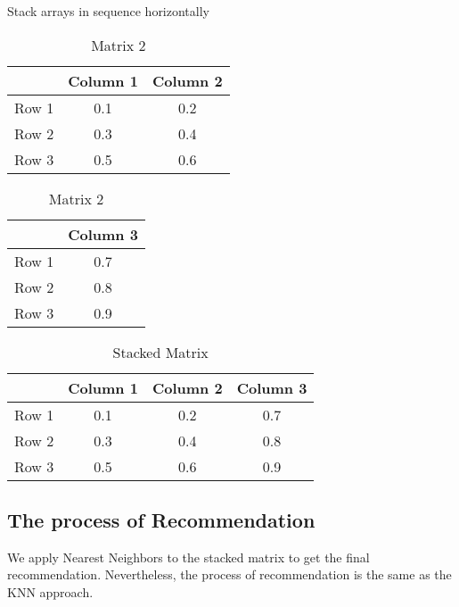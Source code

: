\noindent Stack arrays in sequence horizontally

\begin{table}[htbp]
    \centering
    \begin{minipage}[t]{0.4\textwidth} %
        \centering
        \begin{tabular}{|c|c|c|}
        \hline
        & Column 1 & Column 2 \\
        \hline
        Row 1 & 0.1 & 0.2  \\
        Row 2 & 0.3 & 0.4 \\
        Row 3 & 0.5 & 0.6 \\
        \hline
        \end{tabular}
        \caption{Matrix 1}
    \end{minipage}
    \hspace{20pt} %
    \begin{minipage}[t]{0.4\textwidth} %
        \centering
        \begin{tabular}{|c|c|}
        \hline
        & Column 3\\
        \hline
        Row 1 & 0.7 \\
        Row 2 & 0.8 \\
        Row 3 & 0.9 \\
        \hline
        \end{tabular}
        \caption{Matrix 2}
    \end{minipage}
\end{table}

\begin{table}[htbp]
    \centering
    \begin{tabular}{|c|c|c|c|}
    \hline
    & Column 1 & Column 2 & Column 3 \\
    \hline
    Row 1 & 0.1 & 0.2 & 0.7 \\
    Row 2 & 0.3 & 0.4 & 0.8 \\
    Row 3 & 0.5 & 0.6 & 0.9 \\
    \hline
    \end{tabular}
    \caption{Stacked Matrix}
\end{table}

\subsection{The process of Recommendation}

We apply Nearest Neighbors to the stacked matrix to get the final recommendation.
Nevertheless, the process of recommendation is the same as the KNN approach.


